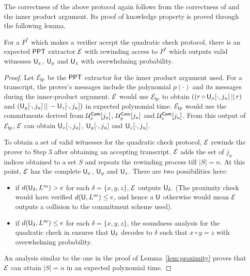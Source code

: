 The correctness of the above protocol again follows from the correctness of \cite{ligero} and the inner product argument. Its proof of knowledge property is proved through the following lemma.
\begin{lemma}
	For a $P^*$ which makes a verifier accept the quadratic check protocol, there is an expected $\mathsf{PPT}$ extractor $\mathcal{E}$ with rewinding access to $P^*$ which outputs valid witnesses $\mathsf{U}_x$, $\mathsf{U}_y$ and $\mathsf{U}_z$ with overwhelming probability.
\end{lemma}
\begin{proof}
	Let $\mathcal{E}_{\mathrm{ip}}$ be the $\mathsf{PPT}$ extractor for the inner product argument used. For a transcript, the prover's messages include the polynomial $p(\cdot)$ and its messages during the inner-product argument.
	$\mathcal{E}$ would use $\mathcal{E}_{\mathrm{ip}}$ to obtain $\left( (r \circ \mathsf{U}_x[\cdot,j_u] \, || \, r \right)$ and $\left( \mathsf{U}_y[\cdot,j_u] \, || \, -\mathsf{U}_z[\cdot,j_u] \right)$ in expected polynomial time. $\mathcal{E}_{\mathrm{ip}}$ would use the commitments derived from $\mathcal{U}^{\mathsf{Com}}_x[j_u]$, $\mathcal{U}^{\mathsf{Com}}_y[j_u]$ and $\mathcal{U}^{\mathsf{Com}}_z[j_u]$. From this output of $\mathcal{E}_{\mathrm{ip}}$, $\mathcal{E}$ can obtain $\mathsf{U}_x[\cdot,j_u]$, $\mathsf{U}_y[\cdot,j_u]$ and $\mathsf{U}_z[\cdot,j_u]$.
	
	To obtain a set of valid witnesses for the quadratic check protocol, $\mathcal{E}$ rewinds the prover to Step 3 after obtaining an accepting transcript. $\mathcal{E}$ adds the set of $j_u$ indices obtained to a set $S$ and repeats the rewinding process till $|S| = n$. At this point, $\mathcal{E}$ has the complete $\mathsf{U}_x$, $\mathsf{U}_y$ and $\mathsf{U}_z$. There are two possibilities here:
	\begin{itemize}
		\item if $d(\mathsf{U}_\delta,L^m) > e$ for each $\delta = \{x, y, z\}$, $\mathcal{E}$ outputs $\mathsf{U}_\delta$. (The proximity check would have verified $d(\mathsf{U},L^m) \leq e$, and hence a $\mathsf{U}$ otherwise would mean $\mathcal{E}$ outputs a collision to the commitment scheme used).
		\item if $d(\mathsf{U}_\delta,L^m) \leq e$ for each $\delta = \{x, y, z\}$, the soundness analysis for the quadratic check in \cite{ligero} ensures that $\mathsf{U}_\delta$ decodes to $\delta$ such that $x\circ y = z$ with overwhelming probability.
	\end{itemize}
	An analysis similar to the one in the proof of Lemma~\ref{lem:proximity} proves that $\mathcal{E}$ can attain $|S| = n$ in an expected polynomial time.
\end{proof}

